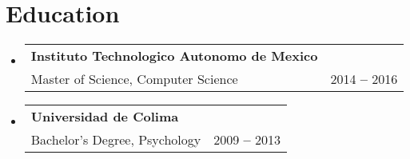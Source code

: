 \documentclass[letterpaper,11pt]{article}
\makeatletter
\newcommand{\resumeEducationHeading}[4]{
  \vspace{-2pt}\item
    \begin{tabular*}{0.97\textwidth}[t]{l@{\extracolsep{\fill}}r}
      \textbf{#1} & #2 \\
      \small #3 & \small #4 \\
    \end{tabular*}\vspace{-5pt}
}
\newcommand{\resumeSubHeadingListStart}{\begin{itemize}[leftmargin=0.15in, label={}]}
\newcommand{\resumeSubHeadingListEnd}{\end{itemize}}
\makeatother
\begin{document}





\section{Education}
  \vspace{3pt}
  \resumeSubHeadingListStart
    
    \resumeEducationHeading
      {Instituto Technologico Autonomo de Mexico
      }{}
      {Master of Science, Computer Science}{2014 \textbf{--} 2016}

    \resumeEducationHeading
      {Universidad de Colima
      }{}
      {Bachelor’s Degree, Psychology}{2009 \textbf{--} 2013}
    
  \resumeSubHeadingListEnd



\end{document}
